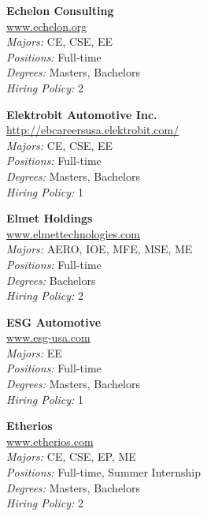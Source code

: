 \documentclass[twoside]{article}
\begin{document}
\begin{center}
\begin{multicols}{3}
\begin{minipage}{.9\columnwidth}{\Large\bf Echelon Consulting }\\
	\url{www.echelon.org}\\
	\emph{Majors:} CE, CSE, EE\\
	\emph{Positions:} Full-time\\
	\emph{Degrees:} Masters, Bachelors\\
	\emph{Hiring Policy:} 2\\
\end{minipage}
 
\begin{minipage}{.9\columnwidth}{\Large\bf Elektrobit Automotive Inc. }\\
	\url{http://ebcareersusa.elektrobit.com/}\\
	\emph{Majors:} CE, CSE, EE\\
	\emph{Positions:} Full-time\\
	\emph{Degrees:} Masters, Bachelors\\
	\emph{Hiring Policy:} 1\\
\end{minipage}
 
\begin{minipage}{.9\columnwidth}{\Large\bf Elmet Holdings }\\
	\url{www.elmettechnologies.com}\\
	\emph{Majors:} AERO, IOE, MFE, MSE, ME\\
	\emph{Positions:} Full-time\\
	\emph{Degrees:} Bachelors\\
	\emph{Hiring Policy:} 2\\
\end{minipage}
 
\begin{minipage}{.9\columnwidth}{\Large\bf ESG Automotive }\\
	\url{www.esg-usa.com}\\
	\emph{Majors:} EE\\
	\emph{Positions:} Full-time\\
	\emph{Degrees:} Masters, Bachelors\\
	\emph{Hiring Policy:} 1\\
\end{minipage}
 
\begin{minipage}{.9\columnwidth}{\Large\bf Etherios }\\
	\url{www.etherios.com}\\
	\emph{Majors:} CE, CSE, EP, ME\\
	\emph{Positions:} Full-time, Summer Internship\\
	\emph{Degrees:} Masters, Bachelors\\
	\emph{Hiring Policy:} 2\\
\end{minipage}
 

\end{multicols}
\end{center}
\end{document}
